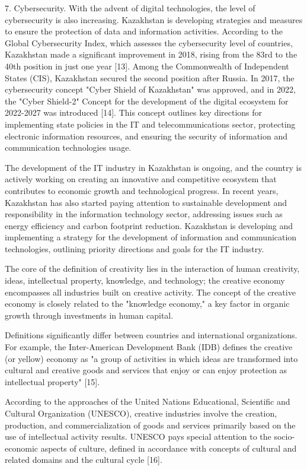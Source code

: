 7. Cybersecurity. With the advent of digital technologies, the level of
cybersecurity is also increasing. Kazakhstan is developing strategies
and measures to ensure the protection of data and information
activities. According to the Global Cybersecurity Index, which assesses
the cybersecurity level of countries, Kazakhstan made a significant
improvement in 2018, rising from the 83rd to the 40th position in just
one year {[}13{]}. Among the Commonwealth of Independent States (CIS),
Kazakhstan secured the second position after Russia. In 2017, the
cybersecurity concept "Cyber Shield of Kazakhstan" was approved, and in
2022, the "Cyber Shield-2" Concept for the development of the digital
ecosystem for 2022-2027 was introduced {[}14{]}. This concept outlines
key directions for implementing state policies in the IT and
telecommunications sector, protecting electronic information resources,
and ensuring the security of information and communication technologies
usage.

The development of the IT industry in Kazakhstan is ongoing, and the
country is actively working on creating an innovative and competitive
ecosystem that contributes to economic growth and technological
progress. In recent years, Kazakhstan has also started paying attention
to sustainable development and responsibility in the information
technology sector, addressing issues such as energy efficiency and
carbon footprint reduction. Kazakhstan is developing and implementing a
strategy for the development of information and communication
technologies, outlining priority directions and goals for the IT
industry.

The core of the definition of creativity lies in the interaction of
human creativity, ideas, intellectual property, knowledge, and
technology; the creative economy encompasses all industries built on
creative activity. The concept of the creative economy is closely
related to the "knowledge economy," a key factor in organic growth
through investments in human capital.

Definitions significantly differ between countries and international
organizations. For example, the Inter-American Development Bank (IDB)
defines the creative (or yellow) economy as "a group of activities in
which ideas are transformed into cultural and creative goods and
services that enjoy or can enjoy protection as intellectual property"
{[}15{]}.

According to the approaches of the United Nations Educational,
Scientific and Cultural Organization (UNESCO), creative industries
involve the creation, production, and commercialization of goods and
services primarily based on the use of intellectual activity results.
UNESCO pays special attention to the socio-economic aspects of culture,
defined in accordance with concepts of cultural and related domains and
the cultural cycle {[}16{]}.

